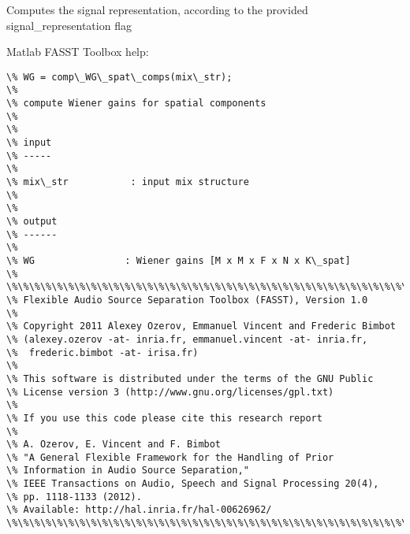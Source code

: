 \documentclass[letterpaper,10pt,english]{sphinxmanual}
\begin{document}
\begin{fulllineitems}
\begin{fulllineitems}
\end{fulllineitems}


\begin{fulllineitems}
\label{reference/audiomodel:pyfasst.audioModel.FASST.comp_transf_Cx}
Computes the signal representation, according
to the provided signal\_representation flag

\end{fulllineitems}


\begin{fulllineitems}
\label{reference/audiomodel:pyfasst.audioModel.FASST.compute_Wiener_gain_2d}
Matlab FASST Toolbox help:

\begin{Verbatim}[commandchars=\\\{\}]
\% WG = comp\_WG\_spat\_comps(mix\_str);
\%
\% compute Wiener gains for spatial components
\%
\%
\% input
\% -----
\%
\% mix\_str           : input mix structure
\% 
\%
\% output
\% ------
\%
\% WG                : Wiener gains [M x M x F x N x K\_spat]
\%
\%\%\%\%\%\%\%\%\%\%\%\%\%\%\%\%\%\%\%\%\%\%\%\%\%\%\%\%\%\%\%\%\%\%\%\%\%\%\%\%\%\%\%\%\%\%\%\%\%\%\%\%\%\%\%\%\%\%\%\%\%\%\%\%\%\%\%\%\%\%\%
\% Flexible Audio Source Separation Toolbox (FASST), Version 1.0
\%
\% Copyright 2011 Alexey Ozerov, Emmanuel Vincent and Frederic Bimbot
\% (alexey.ozerov -at- inria.fr, emmanuel.vincent -at- inria.fr,
\%  frederic.bimbot -at- irisa.fr)     
\%
\% This software is distributed under the terms of the GNU Public 
\% License version 3 (http://www.gnu.org/licenses/gpl.txt)
\%
\% If you use this code please cite this research report
\%
\% A. Ozerov, E. Vincent and F. Bimbot
\% "A General Flexible Framework for the Handling of Prior
\% Information in Audio Source Separation," 
\% IEEE Transactions on Audio, Speech and Signal Processing 20(4),
\% pp. 1118-1133 (2012).
\% Available: http://hal.inria.fr/hal-00626962/
\%\%\%\%\%\%\%\%\%\%\%\%\%\%\%\%\%\%\%\%\%\%\%\%\%\%\%\%\%\%\%\%\%\%\%\%\%\%\%\%\%\%\%\%\%\%\%\%\%\%\%\%\%\%\%\%\%\%\%\%\%\%\%\%\%\%\%\%\%\%\%
\end{Verbatim}


\end{fulllineitems}
\end{fulllineitems}
\end{document}
